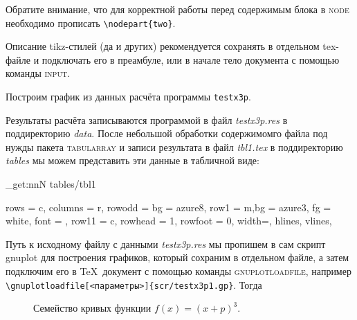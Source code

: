 Обратите внимание, что для корректной работы перед содержимым блока в \textsc{node} необходимо прописать \verb|\nodepart{two}|.

Описание tikz\nobreak-стилей (да и других) рекомендуется сохранять в отдельном tex\nobreak-файле и подключать его в преамбуле, или в начале тело документа с помощью команды \textsc{input}.

Построим график из данных расчёта программы \texttt{testx3p}.


Результаты расчёта записываются программой в файл \textsl{testx3p.res} в поддиректорию \textsl{data}. После небольшой обработки содержимомго файла под нужды пакета \textsc{tabularray} и записи результата в файл \textsl{tbl1.tex} в поддиректорию \textsl{tables} мы можем представить эти данные в табличной виде:


\ExplSyntaxOn
\file_get:nnN {tables/tbl1} {\ExplSyntaxOff} \tblone
\ExplSyntaxOff


\begin{longtblr}[
	caption = {Результаты расчёта программы \texttt{testx3p}.},
	entry = {Расчёта программы \texttt{testx3p}.},
	label = {tblr:rezultaty_raschyota_programmy_testx3p},
	baseline = m,
	expand = \expandafter,
]{
	rows = {c},
	columns = {r},
	row{odd} = {bg = azure8},
	row{1} = {m,bg = azure3, fg = white, font = \sffamily},
	row{1}{1} = {c},
	rowhead = 1,
	rowfoot = 0,
	width=\textwidth,
	hlines,
	vlines,
}
	\expandafter\empty\tblone

\end{longtblr}

Путь к исходному файлу с данными \textsl{testx3p.res} мы пропишем в сам скрипт gnuplot для построения графиков, который сохраним в отдельном файле, а затем подключим его в \TeX\ документ с помощью команды \textsc{gnuplotloadfile}, например \\ \verb|\gnuplotloadfile[<параметры>]{scr/testx3p1.gp}|. Тогда
\begin{figure}[h]%
	\centering%
	\caption{Семейство кривых функции $f(x) = (x + p)^{3}$.}%
	\label{fig:semejstvo_krivyx_funkcii_fx}%
\end{figure}%

